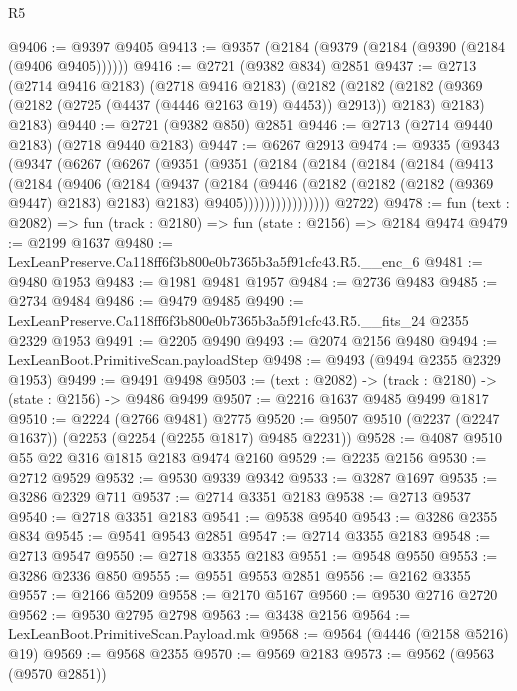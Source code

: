 \begin{lexlean}{R5}
\begin{coremodule}
@9406 := @9397 @9405
@9413 := @9357 (@2184 (@9379 (@2184 (@9390 (@2184 (@9406 @9405))))))
@9416 := @2721 (@9382 @834) @2851
@9437 := @2713
    (@2714 @9416 @2183)
    (@2718 @9416 @2183)
    (@2182
      (@2182 (@2182 (@9369 (@2182 (@2725 (@4437 (@4446 @2163 @19) @4453)) @2913)) @2183) @2183)
      @2183)
@9440 := @2721 (@9382 @850) @2851
@9446 := @2713 (@2714 @9440 @2183) (@2718 @9440 @2183)
@9447 := @6267 @2913
@9474 := @9335
    (@9343
      (@9347
        (@6267
          (@6267
            (@9351
              (@9351
                (@2184
                  (@2184
                    (@2184
                      (@2184
                        (@9413
                          (@2184
                            (@9406
                              (@2184
                                (@9437
                                  (@2184
                                    (@9446
                                      (@2182 (@2182 (@2182 (@9369 @9447) @2183) @2183) @2183)
                                      @9405))))))))))))))))
      @2722)
@9478 := fun (text : @2082) => fun (track : @2180) => fun (state : @2156) => @2184 @9474
@9479 := @2199 @1637
@9480 := LexLeanPreserve.Ca118ff6f3b800e0b7365b3a5f91cfc43.R5.__enc_6
@9481 := @9480 @1953
@9483 := @1981 @9481 @1957
@9484 := @2736 @9483
@9485 := @2734 @9484
@9486 := @9479 @9485
@9490 := LexLeanPreserve.Ca118ff6f3b800e0b7365b3a5f91cfc43.R5.__fits_24 @2355 @2329 @1953
@9491 := @2205 @9490
@9493 := @2074 @2156 @9480
@9494 := LexLeanBoot.PrimitiveScan.payloadStep
@9498 := @9493 (@9494 @2355 @2329 @1953)
@9499 := @9491 @9498
@9503 := (text : @2082) -> (track : @2180) -> (state : @2156) -> @9486 @9499
@9507 := @2216 @1637 @9485 @9499 @1817
@9510 := @2224 (@2766 @9481) @2775
@9520 := @9507 @9510 (@2237 (@2247 @1637)) (@2253 (@2254 (@2255 @1817) @9485 @2231))
@9528 := @4087 @9510 @55 @22 @316 @1815 @2183 @9474 @2160
@9529 := @2235 @2156
@9530 := @2712 @9529
@9532 := @9530 @9339 @9342
@9533 := @3287 @1697
@9535 := @3286 @2329 @711
@9537 := @2714 @3351 @2183
@9538 := @2713 @9537
@9540 := @2718 @3351 @2183
@9541 := @9538 @9540
@9543 := @3286 @2355 @834
@9545 := @9541 @9543 @2851
@9547 := @2714 @3355 @2183
@9548 := @2713 @9547
@9550 := @2718 @3355 @2183
@9551 := @9548 @9550
@9553 := @3286 @2336 @850
@9555 := @9551 @9553 @2851
@9556 := @2162 @3355
@9557 := @2166 @5209
@9558 := @2170 @5167
@9560 := @9530 @2716 @2720
@9562 := @9530 @2795 @2798
@9563 := @3438 @2156
@9564 := LexLeanBoot.PrimitiveScan.Payload.mk
@9568 := @9564 (@4446 (@2158 @5216) @19)
@9569 := @9568 @2355
@9570 := @9569 @2183
@9573 := @9562 (@9563 (@9570 @2851))

\end{coremodule}
\end{lexlean}

